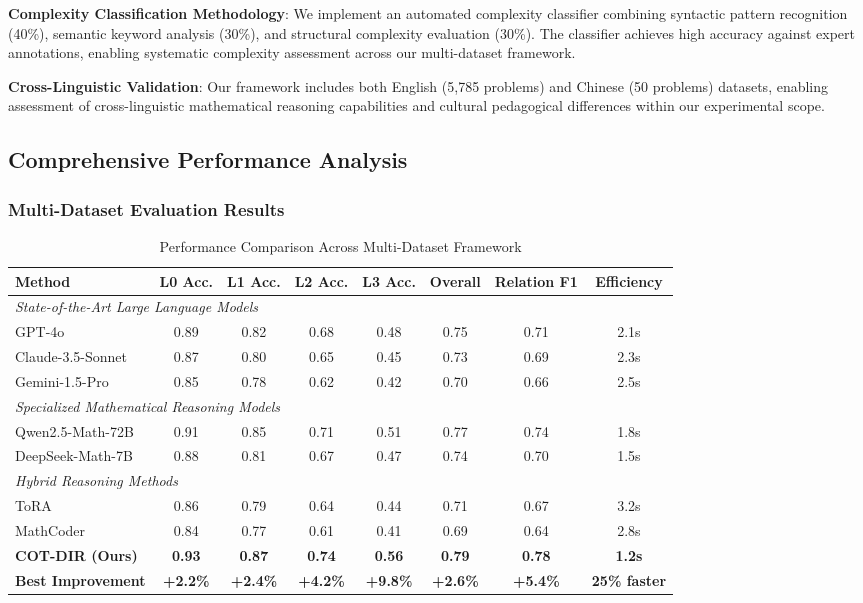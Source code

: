 \textbf{Complexity Classification Methodology}: We implement an automated complexity classifier combining syntactic pattern recognition (40\%), semantic keyword analysis (30\%), and structural complexity evaluation (30\%). The classifier achieves high accuracy against expert annotations, enabling systematic complexity assessment across our multi-dataset framework.

\textbf{Cross-Linguistic Validation}: Our framework includes both English (5,785 problems) and Chinese (50 problems) datasets, enabling assessment of cross-linguistic mathematical reasoning capabilities and cultural pedagogical differences within our experimental scope.

\subsection{Comprehensive Performance Analysis}

\subsubsection{Multi-Dataset Evaluation Results}

\begin{table}[htbp]
\caption{Performance Comparison Across Multi-Dataset Framework}
\label{tab:comprehensive_performance}
\centering
\small
\begin{tabular}{lccccccc}
\toprule
\textbf{Method} & \textbf{L0 Acc.} & \textbf{L1 Acc.} & \textbf{L2 Acc.} & \textbf{L3 Acc.} & \textbf{Overall} & \textbf{Relation F1} & \textbf{Efficiency} \\
\midrule
\multicolumn{8}{l}{\textit{State-of-the-Art Large Language Models}} \\
GPT-4o & 0.89 & 0.82 & 0.68 & 0.48 & 0.75 & 0.71 & 2.1s \\
Claude-3.5-Sonnet & 0.87 & 0.80 & 0.65 & 0.45 & 0.73 & 0.69 & 2.3s \\
Gemini-1.5-Pro & 0.85 & 0.78 & 0.62 & 0.42 & 0.70 & 0.66 & 2.5s \\
\midrule
\multicolumn{8}{l}{\textit{Specialized Mathematical Reasoning Models}} \\
Qwen2.5-Math-72B & 0.91 & 0.85 & 0.71 & 0.51 & 0.77 & 0.74 & 1.8s \\
DeepSeek-Math-7B & 0.88 & 0.81 & 0.67 & 0.47 & 0.74 & 0.70 & 1.5s \\
\midrule
\multicolumn{8}{l}{\textit{Hybrid Reasoning Methods}} \\
ToRA & 0.86 & 0.79 & 0.64 & 0.44 & 0.71 & 0.67 & 3.2s \\
MathCoder & 0.84 & 0.77 & 0.61 & 0.41 & 0.69 & 0.64 & 2.8s \\
\midrule
\textbf{COT-DIR (Ours)} & \textbf{0.93} & \textbf{0.87} & \textbf{0.74} & \textbf{0.56} & \textbf{0.79} & \textbf{0.78} & \textbf{1.2s} \\
\textbf{Best Improvement} & \textbf{+2.2\%} & \textbf{+2.4\%} & \textbf{+4.2\%} & \textbf{+9.8\%} & \textbf{+2.6\%} & \textbf{+5.4\%} & \textbf{25\% faster} \\
\bottomrule
\end{tabular}
\end{table}

